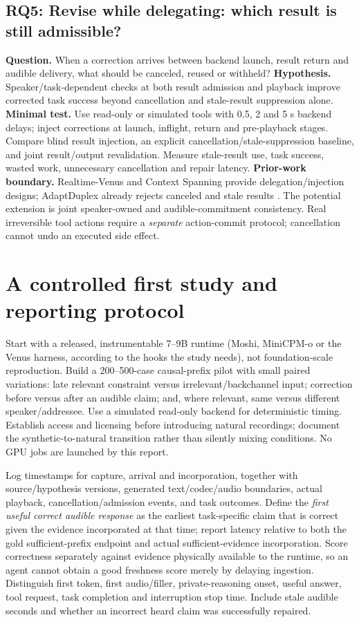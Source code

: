 \documentclass{article}
\newcommand{\researchquestion}[2]{\subsection{#1: #2}}
\begin{document}
\researchquestion{RQ5}{Revise while delegating: which result is still admissible?}
\textbf{Question.} When a correction arrives between backend launch, result return and audible delivery, what should be canceled, reused or withheld? \textbf{Hypothesis.} Speaker/task-dependent checks at both result admission and playback improve corrected task success beyond cancellation and stale-result suppression alone. \textbf{Minimal test.} Use read-only or simulated tools with 0.5, 2 and 5 s backend delays; inject corrections at launch, inflight, return and pre-playback stages. Compare blind result injection, an explicit cancellation/stale-suppression baseline, and joint result/output revalidation. Measure stale-result use, task success, wasted work, unnecessary cancellation and repair latency. \textbf{Prior-work boundary.} Realtime-Venus and Context Spanning provide delegation/injection designs; AdaptDuplex already rejects canceled and stale results \citep{venus,contextspan,adapt}. The potential extension is joint speaker-owned and audible-commitment consistency. Real irreversible tool actions require a \emph{separate} action-commit protocol; cancellation cannot undo an executed side effect.

\section{A controlled first study and reporting protocol}
\label{sec:protocol}
Start with a released, instrumentable 7--9B runtime (Moshi, MiniCPM-o or the Venus harness, according to the hooks the study needs), not foundation-scale reproduction. Build a 200--500-case causal-prefix pilot with small paired variations: late relevant constraint versus irrelevant/backchannel input; correction before versus after an audible claim; and, where relevant, same versus different speaker/addressee. Use a simulated read-only backend for deterministic timing. Establish access and licensing before introducing natural recordings; document the synthetic-to-natural transition rather than silently mixing conditions. No GPU jobs are launched by this report.

Log timestamps for capture, arrival and incorporation, together with source/hypothesis versions, generated text/codec/audio boundaries, actual playback, cancellation/admission events, and task outcomes. Define the \emph{first useful correct audible response} as the earliest task-specific claim that is correct given the evidence incorporated at that time; report latency relative to both the gold sufficient-prefix endpoint and actual sufficient-evidence incorporation. Score correctness separately against evidence physically available to the runtime, so an agent cannot obtain a good freshness score merely by delaying ingestion. Distinguish first token, first audio/filler, private-reasoning onset, useful answer, tool request, task completion and interruption stop time. Include stale audible seconds and whether an incorrect heard claim was successfully repaired.
\end{document}
